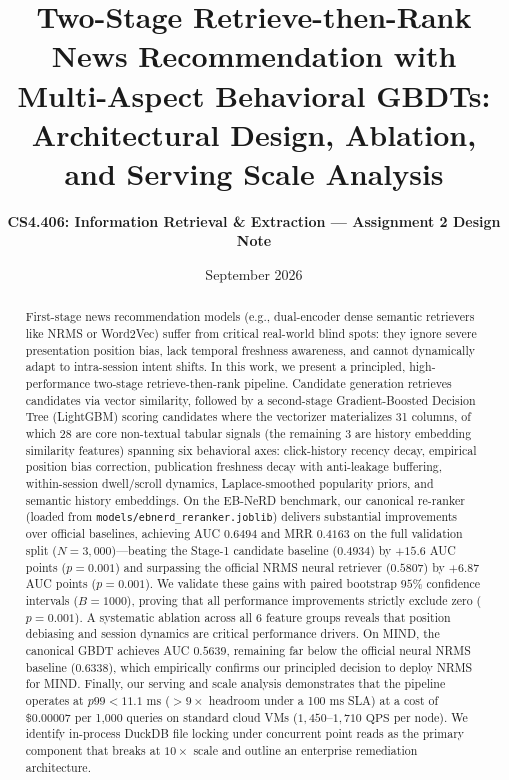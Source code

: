 \documentclass[11pt,a4paper]{article}
\title{\textbf{Two-Stage Retrieve-then-Rank News Recommendation with Multi-Aspect Behavioral GBDTs: Architectural Design, Ablation, and Serving Scale Analysis}}
\author{\textbf{CS4.406: Information Retrieval \& Extraction --- Assignment 2 Design Note}}
\date{September 2026}
\begin{document}
\maketitle

\begin{abstract}
First-stage news recommendation models (e.g., dual-encoder dense semantic retrievers like NRMS or Word2Vec) suffer from critical real-world blind spots: they ignore severe presentation position bias, lack temporal freshness awareness, and cannot dynamically adapt to intra-session intent shifts. In this work, we present a principled, high-performance two-stage retrieve-then-rank pipeline. Candidate generation retrieves candidates via vector similarity, followed by a second-stage Gradient-Boosted Decision Tree (LightGBM) scoring candidates where the vectorizer materializes 31 columns, of which 28 are core non-textual tabular signals (the remaining 3 are history embedding similarity features) spanning six behavioral axes: click-history recency decay, empirical position bias correction, publication freshness decay with anti-leakage buffering, within-session dwell/scroll dynamics, Laplace-smoothed popularity priors, and semantic history embeddings. On the EB-NeRD benchmark, our canonical re-ranker (loaded from \texttt{models/ebnerd\_reranker.joblib}) delivers substantial improvements over official baselines, achieving AUC $0.6494$ and MRR $0.4163$ on the full validation split ($N=3,000$)---beating the Stage-1 candidate baseline ($0.4934$) by $+15.6$ AUC points ($p=0.001$) and surpassing the official NRMS neural retriever ($0.5807$) by $+6.87$ AUC points ($p=0.001$). We validate these gains with paired bootstrap $95\%$ confidence intervals ($B = 1000$), proving that all performance improvements strictly exclude zero ($p = 0.001$). A systematic ablation across all 6 feature groups reveals that position debiasing and session dynamics are critical performance drivers. On MIND, the canonical GBDT achieves AUC $0.5639$, remaining far below the official neural NRMS baseline ($0.6338$), which empirically confirms our principled decision to deploy NRMS for MIND. Finally, our serving and scale analysis demonstrates that the pipeline operates at $p99 < 11.1\text{ ms}$ ($>9\times$ headroom under a 100 ms SLA) at a cost of $\$0.00007$ per 1,000 queries on standard cloud VMs ($1,450$--$1,710\text{ QPS}$ per node). We identify in-process DuckDB file locking under concurrent point reads as the primary component that breaks at $10\times$ scale and outline an enterprise remediation architecture.
\end{abstract}
\end{document}
